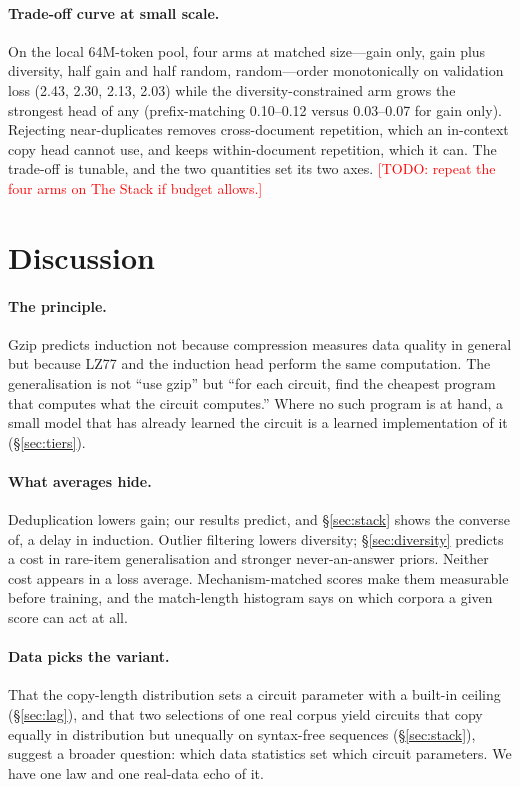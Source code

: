 \documentclass[11pt]{article}
\newcommand{\todo}[1]{\textcolor{red}{[TODO: #1]}}
\begin{document}
\paragraph{Trade-off curve at small scale.}
On the local 64M-token pool, four arms at matched size---gain only, gain
plus diversity, half gain and half random, random---order monotonically on
validation loss (2.43, 2.30, 2.13, 2.03) while the diversity-constrained
arm grows the strongest head of any (prefix-matching 0.10--0.12 versus
0.03--0.07 for gain only). Rejecting near-duplicates removes
cross-document repetition, which an in-context copy head cannot use, and
keeps within-document repetition, which it can. The trade-off is tunable,
and the two quantities set its two axes. \todo{repeat the four arms on The
Stack if budget allows.}

\section{Discussion}\label{sec:discussion}

\paragraph{The principle.}
Gzip predicts induction not because compression measures data quality in
general but because LZ77 and the induction head perform the same
computation. The generalisation is not ``use gzip'' but ``for each circuit,
find the cheapest program that computes what the circuit computes.'' Where
no such program is at hand, a small model that has already learned the
circuit is a learned implementation of it (\S\ref{sec:tiers}).

\paragraph{What averages hide.}
Deduplication lowers gain; our results predict, and \S\ref{sec:stack}
shows the converse of, a delay in induction. Outlier filtering lowers
diversity; \S\ref{sec:diversity} predicts a cost in rare-item
generalisation and stronger never-an-answer priors. Neither cost appears
in a loss average. Mechanism-matched scores make them measurable before
training, and the match-length histogram says on which corpora a given
score can act at all.

\paragraph{Data picks the variant.}
That the copy-length distribution sets a circuit parameter with a built-in
ceiling (\S\ref{sec:lag}), and that two selections of one real corpus
yield circuits that copy equally in distribution but unequally on
syntax-free sequences (\S\ref{sec:stack}), suggest a broader question:
which data statistics set which circuit parameters. We have one law and
one real-data echo of it.
\end{document}

